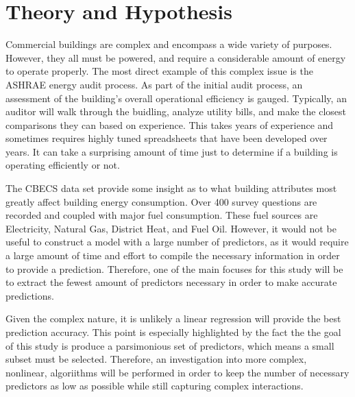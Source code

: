 \section*{Theory and Hypothesis}
\label{sec:theory_and_hypothesis}

Commercial buildings are complex and encompass a wide variety of purposes. However, they all must be powered, and require a considerable amount of energy to operate properly.  The most direct example of this complex issue is the ASHRAE energy audit process.  As part of the initial audit process, an assessment of the building's overall operational efficiency is gauged.  Typically, an auditor will walk through the buidling, analyze utility bills, and make the closest comparisons they can based on experience.  This takes years of experience and sometimes requires highly tuned spreadsheets that have been developed over years.  It can take a surprising amount of time just to determine if a building is operating efficiently or not.

The CBECS data set provide some insight as to what building attributes most greatly affect building energy consumption.  Over 400 survey questions are recorded and coupled with major fuel consumption.  These fuel sources are Electricity, Natural Gas, District Heat, and Fuel Oil.  However, it would not be useful to construct a model with a large number of predictors, as it would require a large amount of time and effort to compile the necessary information in order to provide a prediction.  Therefore, one of the main focuses for this study will be to extract the fewest amount of predictors necessary in order to make accurate predictions.  

Given the complex nature, it is unlikely a linear regression will provide the best prediction accuracy.  This point is especially highlighted by the fact the the goal of this study is produce a parsimonious set of predictors, which means a small subset must be selected.  Therefore, an investigation into more complex, nonlinear, algoriithms will be performed in order to keep the number of necessary predictors as low as possible while still capturing complex interactions.